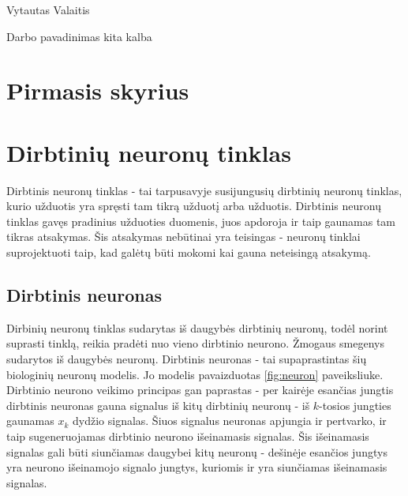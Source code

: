 \documentclass[a4paper,12pt,fleqn]{article}
\begin{document}
 {}{}{}{}%
 {Vytautas Valaitis}

\tableofcontents



\bothabstracts{}%
{Darbo pavadinimas kita kalba} %
{}%






\newpage
\section{Pirmasis skyrius}
\label{sec:motivation}

\section{Dirbtinių neuronų tinklas}

Dirbtinis neuronų tinklas - tai tarpusavyje susijungusių dirbtinių neuronų tinklas, kurio užduotis yra spręsti tam tikrą užduotį arba užduotis.
Dirbtinis neuronų tinklas gavęs pradinius užduoties duomenis, juos apdoroja ir taip gaunamas tam tikras atsakymas.
Šis atsakymas nebūtinai yra teisingas - neuronų tinklai suprojektuoti taip, kad galėtų būti mokomi kai gauna neteisingą atsakymą.

\subsection{Dirbtinis neuronas}

Dirbinių neuronų tinklas sudarytas iš daugybės dirbtinių neuronų, todėl norint suprasti tinklą, reikia pradėti nuo vieno dirbtinio neurono.
Žmogaus smegenys sudarytos iš daugybės neuronų.
Dirbtinis neuronas - tai supaprastintas šių biologinių neuronų modelis.
Jo modelis pavaizduotas \ref{fig:neuron} paveiksliuke.
Dirbtinio neurono veikimo principas gan paprastas - per kairėje esančias jungtis dirbtinis neuronas gauna signalus iš kitų dirbtinių neuronų - iš $k$-tosios jungties gaunamas $x_k$ dydžio signalas.
Šiuos signalus neuronas apjungia ir pertvarko, ir taip sugeneruojamas dirbtinio neurono išeinamasis signalas.
Šis išeinamasis signalas gali būti siunčiamas daugybei kitų neuronų - dešinėje esančios jungtys yra neurono išeinamojo signalo jungtys, kuriomis ir yra siunčiamas išeinamasis signalas.
\end{document}
